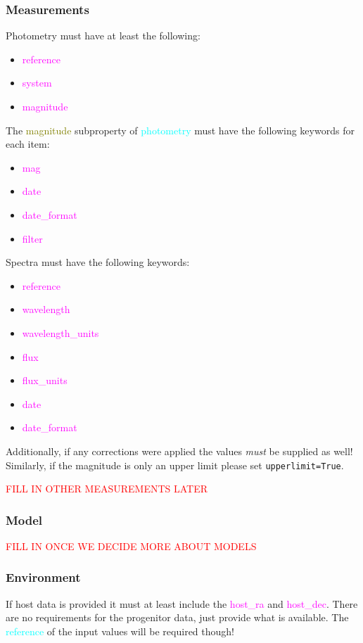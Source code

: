 \documentclass[tighten]{aastex631}
\newcommand{\property}[1]{\textcolor{cyan}{#1}}
\newcommand{\subproperty}[1]{\textcolor{olive}{#1}}
\newcommand{\keyword}[1]{\textcolor{magenta}{#1}}
\begin{document}
\subsubsection{Measurements} \label{subsec:measurement_requirements}
Photometry must have at least the following:
\begin{itemize}
    \item \keyword{reference}
    \item \keyword{system}

    \item \keyword{magnitude}
\end{itemize}

The \subproperty{magnitude} subproperty of \property{photometry} must have the following keywords for each item:
\begin{itemize}
    \item \keyword{mag}
    \item \keyword{date}
    \item \keyword{date\_format}
    \item \keyword{filter}
\end{itemize}

Spectra must have the following keywords:
\begin{itemize}
    \item \keyword{reference}
    \item \keyword{wavelength}
    \item \keyword{wavelength\_units}
    \item \keyword{flux}
    \item \keyword{flux\_units}
    \item \keyword{date}
    \item \keyword{date\_format}
\end{itemize}

Additionally, if any corrections were applied the values \textit{must} be supplied as well! Similarly, if the magnitude is only an upper limit please set \texttt{upperlimit=True}.

\textcolor{red}{FILL IN OTHER MEASUREMENTS LATER}

\subsubsection{Model}
\textcolor{red}{FILL IN ONCE WE DECIDE MORE ABOUT MODELS}

\subsubsection{Environment}
If host data is provided it must at least include the \keyword{host\_ra} and \keyword{host\_dec}. There are no requirements for the progenitor data, just provide what is available. The \property{reference} of the input values will be required though!
\end{document}
